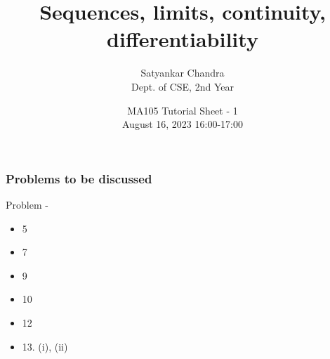 \documentclass[
	11pt, %
]{beamer}
\title[Tut 2]{Sequences, limits, continuity, differentiability} %
\author[Satyankar Chandra]{Satyankar Chandra \\ \scriptsize Dept. of CSE, 2nd Year} %
\date[August 16, 2023]{MA105 Tutorial Sheet - 1 \\ \scriptsize August 16, 2023 16:00-17:00} %
\begin{document}

\begin{frame}
	\titlepage %
\end{frame}



\begin{frame}
	\frametitle{Problems to be discussed} %
	
	Problem -
	\begin{itemize}
		\item 5
		\item 7
		\item 9
		\item 10
		\item 12
		\item 13. (i), (ii)
	\end{itemize}
\end{frame}

\end{document}
